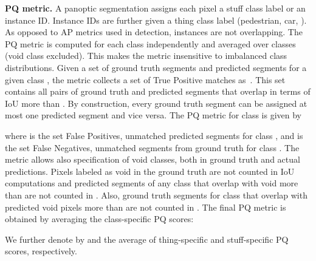 \documentclass[10pt,twocolumn,letterpaper]{article}
\renewcommand{\paragraph}[1]{
        \vspace{3pt}
	\noindent\textbf{#1}}
\begin{document}
\paragraph{PQ metric.} A panoptic segmentation assigns each pixel a stuff class label or an instance ID. Instance IDs are further given a thing class label (\eg pedestrian, car, \etc). As opposed to AP metrics used in detection, instances are not overlapping. The PQ metric is computed for each class independently and averaged over classes (void class excluded). This makes the metric insensitive to imbalanced class distributions. Given a set of ground truth segments  and predicted segments  for a given class , the metric collects a set of True Positive matches as \,.
This set contains all pairs of ground truth and predicted segments that overlap in terms of IoU more than . By construction, every ground truth segment can be assigned at most one predicted segment and vice versa. 
The PQ metric for class  is given by

where  is the set False Positives, \ie unmatched predicted segments for class , and  is the set False Negatives, \ie unmatched segments from ground truth for class .
The metric allows also specification of void classes, both in ground truth and actual predictions. 
Pixels labeled as void in the ground truth are not counted in IoU computations and predicted segments of any class  that overlap with void more than  are not counted in . Also, ground truth segments for class  that overlap with predicted void pixels more than  are not counted in . 
The final PQ metric is obtained by averaging the class-specific PQ scores:

We further denote by  and  the average of thing-specific and stuff-specific PQ scores, respectively.
\end{document}

